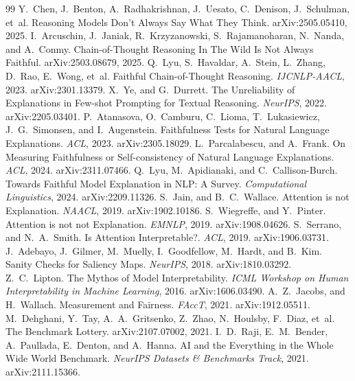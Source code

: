 \begin{thebibliography}{99}
 Y.~Chen, J.~Benton, A.~Radhakrishnan, J.~Uesato, C.~Denison, J.~Schulman, et~al. Reasoning Models Don't Always Say What They Think. arXiv:2505.05410, 2025.
 I.~Arcuschin, J.~Janiak, R.~Krzyzanowski, S.~Rajamanoharan, N.~Nanda, and A.~Conmy. Chain-of-Thought Reasoning In The Wild Is Not Always Faithful. arXiv:2503.08679, 2025.
 Q.~Lyu, S.~Havaldar, A.~Stein, L.~Zhang, D.~Rao, E.~Wong, et~al. Faithful Chain-of-Thought Reasoning. \emph{IJCNLP-AACL}, 2023. arXiv:2301.13379.
 X.~Ye, and G.~Durrett. The Unreliability of Explanations in Few-shot Prompting for Textual Reasoning. \emph{NeurIPS}, 2022. arXiv:2205.03401.
 P.~Atanasova, O.~Camburu, C.~Lioma, T.~Lukasiewicz, J.~G.~Simonsen, and I.~Augenstein. Faithfulness Tests for Natural Language Explanations. \emph{ACL}, 2023. arXiv:2305.18029.
 L.~Parcalabescu, and A.~Frank. On Measuring Faithfulness or Self-consistency of Natural Language Explanations. \emph{ACL}, 2024. arXiv:2311.07466.
 Q.~Lyu, M.~Apidianaki, and C.~Callison-Burch. Towards Faithful Model Explanation in NLP: A Survey. \emph{Computational Linguistics}, 2024. arXiv:2209.11326.
 S.~Jain, and B.~C.~Wallace. Attention is not Explanation. \emph{NAACL}, 2019. arXiv:1902.10186.
 S.~Wiegreffe, and Y.~Pinter. Attention is not not Explanation. \emph{EMNLP}, 2019. arXiv:1908.04626.
 S.~Serrano, and N.~A.~Smith. Is Attention Interpretable?. \emph{ACL}, 2019. arXiv:1906.03731.
 J.~Adebayo, J.~Gilmer, M.~Muelly, I.~Goodfellow, M.~Hardt, and B.~Kim. Sanity Checks for Saliency Maps. \emph{NeurIPS}, 2018. arXiv:1810.03292.
 Z.~C.~Lipton. The Mythos of Model Interpretability. \emph{ICML Workshop on Human Interpretability in Machine Learning}, 2016. arXiv:1606.03490.
 A.~Z.~Jacobs, and H.~Wallach. Measurement and Fairness. \emph{FAccT}, 2021. arXiv:1912.05511.
 M.~Dehghani, Y.~Tay, A.~A.~Gritsenko, Z.~Zhao, N.~Houlsby, F.~Diaz, et~al. The Benchmark Lottery. arXiv:2107.07002, 2021.
 I.~D.~Raji, E.~M.~Bender, A.~Paullada, E.~Denton, and A.~Hanna. AI and the Everything in the Whole Wide World Benchmark. \emph{NeurIPS Datasets \& Benchmarks Track}, 2021. arXiv:2111.15366.

\end{thebibliography}
